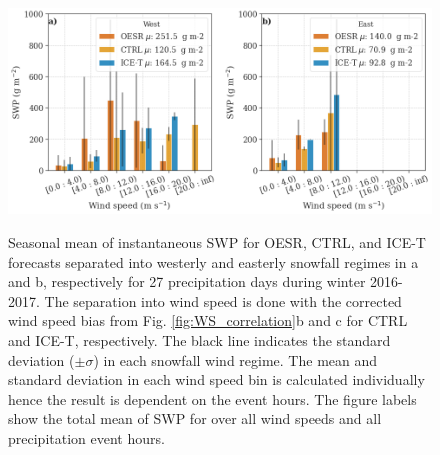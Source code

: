 \documentclass{ametsocV5}
\begin{document}
\begin{figure}
	\noindent\includegraphics[width=\textwidth,angle=0]{fig10.png}\\
	\caption{Seasonal mean of instantaneous SWP for OESR, CTRL, and ICE-T forecasts separated into westerly and easterly snowfall regimes in a and b, respectively for 27 precipitation days during winter 2016-2017. The separation into wind speed is done with the corrected wind speed bias from Fig. \ref{fig:WS_correlation}b and c for CTRL and ICE-T, respectively. The black line indicates the standard deviation ($\pm \sigma$) in each snowfall wind regime. The mean and standard deviation in each wind speed bin is calculated individually hence the result is dependent on the event hours. The figure labels show the total mean of SWP for over all wind speeds and all precipitation event hours. 
	}
	\label{fig:swp_WS_WD}
\end{figure}
\end{document}
